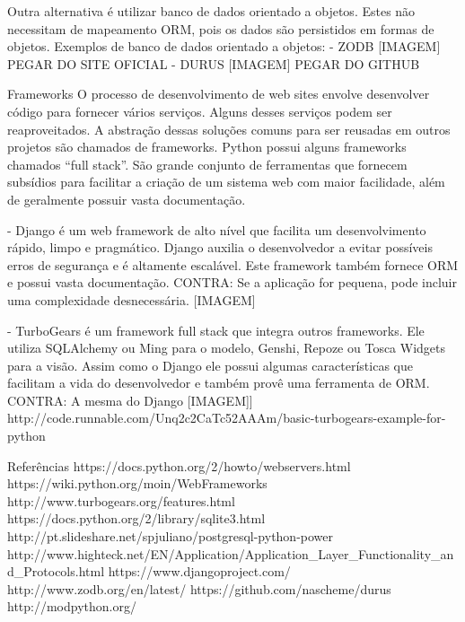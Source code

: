 \documentclass[a4paper, 12pt]{article}
\begin{document}
\begin{enumerate}
  Outra alternativa é utilizar banco de dados orientado a objetos. Estes não necessitam de mapeamento ORM, pois os dados são persistidos em formas de objetos.
  Exemplos de banco de dados orientado a objetos:
  - ZODB [IMAGEM] PEGAR DO SITE OFICIAL
  - DURUS  [IMAGEM] PEGAR DO GITHUB

  Frameworks
  O processo de desenvolvimento de web sites envolve desenvolver código para fornecer vários serviços. Alguns desses serviços podem ser reaproveitados. A abstração dessas soluções comuns para ser reusadas em outros projetos são chamados de frameworks. Python possui alguns frameworks chamados ``full stack''. São grande conjunto de ferramentas que fornecem subsídios para facilitar a criação de um sistema web com maior facilidade, além de geralmente possuir vasta documentação.
  
  - Django é um web framework de alto nível que facilita um desenvolvimento rápido, limpo e pragmático. Django auxilia o desenvolvedor a evitar possíveis erros de segurança e é altamente escalável. Este framework também fornece ORM e possui vasta documentação.
  CONTRA: Se a aplicação for pequena, pode incluir uma complexidade desnecessária. [IMAGEM] 

  - TurboGears é um framework full stack que integra outros frameworks. Ele utiliza SQLAlchemy ou Ming para o modelo, Genshi, Repoze ou Tosca Widgets para a visão. Assim como o Django ele possui algumas características que facilitam a vida do desenvolvedor e também provê uma ferramenta de ORM.
  CONTRA: A mesma do Django
  [IMAGEM]] http://code.runnable.com/Unq2c2CaTc52AAAm/basic-turbogears-example-for-python

    Referências
    https://docs.python.org/2/howto/webservers.html
    https://wiki.python.org/moin/WebFrameworks
    http://www.turbogears.org/features.html
    https://docs.python.org/2/library/sqlite3.html
    http://pt.slideshare.net/spjuliano/postgresql-python-power
    http://www.highteck.net/EN/Application/Application_Layer_Functionality_and_Protocols.html
    https://www.djangoproject.com/
    http://www.zodb.org/en/latest/
    https://github.com/nascheme/durus
    http://modpython.org/
\end{enumerate}
\end{document}
